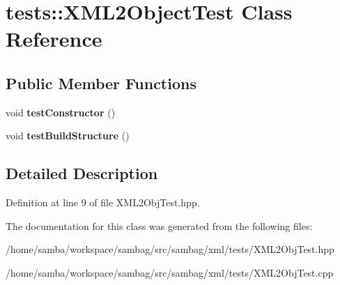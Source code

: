 \hypertarget{classtests_1_1_x_m_l2_object_test}{
\section{tests::XML2ObjectTest Class Reference}
\label{classtests_1_1_x_m_l2_object_test}
}
\subsection*{Public Member Functions}
\begin{DoxyCompactItemize}
\item 
\hypertarget{classtests_1_1_x_m_l2_object_test_a12a2155ad9dbec14c1e042c891ba7b31}{
void {\bfseries testConstructor} ()}
\label{classtests_1_1_x_m_l2_object_test_a12a2155ad9dbec14c1e042c891ba7b31}

\item 
\hypertarget{classtests_1_1_x_m_l2_object_test_a93e51a8b879a976b36a472c4349d7b9c}{
void {\bfseries testBuildStructure} ()}
\label{classtests_1_1_x_m_l2_object_test_a93e51a8b879a976b36a472c4349d7b9c}

\end{DoxyCompactItemize}


\subsection{Detailed Description}


Definition at line 9 of file XML2ObjTest.hpp.



The documentation for this class was generated from the following files:\begin{DoxyCompactItemize}
\item 
/home/samba/workspace/sambag/src/sambag/xml/tests/XML2ObjTest.hpp\item 
/home/samba/workspace/sambag/src/sambag/xml/tests/XML2ObjTest.cpp\end{DoxyCompactItemize}
